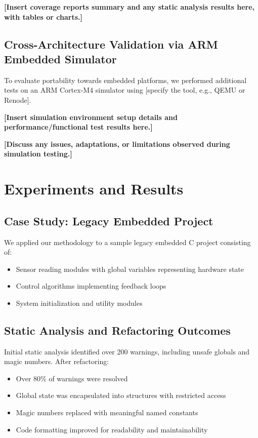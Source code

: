 \documentclass[conference]{IEEEtran}
\begin{document}
	\textbf{[Insert coverage reports summary and any static analysis results here, with tables or charts.]}
	
	\subsection{Cross-Architecture Validation via ARM Embedded Simulator}
	
	To evaluate portability towards embedded platforms, we performed additional tests on an ARM Cortex-M4 simulator using [specify the tool, e.g., QEMU or Renode]. 
	
	\textbf{[Insert simulation environment setup details and performance/functional test results here.]}
	
	\textbf{[Discuss any issues, adaptations, or limitations observed during simulation testing.]}
	
	\section{Experiments and Results}
	\label{sec:results}
	
	\subsection{Case Study: Legacy Embedded Project}
	We applied our methodology to a sample legacy embedded C project consisting of:
	
	\begin{itemize}
		\item Sensor reading modules with global variables representing hardware state
		\item Control algorithms implementing feedback loops
		\item System initialization and utility modules
	\end{itemize}
	
	\subsection{Static Analysis and Refactoring Outcomes}
	Initial static analysis identified over 200 warnings, including unsafe globals and magic numbers. After refactoring:
	
	\begin{itemize}
		\item Over 80\% of warnings were resolved
		\item Global state was encapsulated into structures with restricted access
		\item Magic numbers replaced with meaningful named constants
		\item Code formatting improved for readability and maintainability
	\end{itemize}
	
\end{document}
